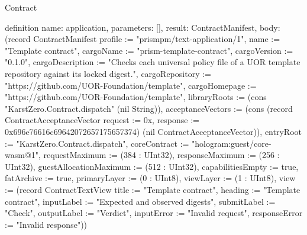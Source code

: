 \begin{lexlean}{Contract}
\begin{semanticmodule}
definition{
  name: application,
  parameters: [],
  result: ContractManifest,
  body: (record ContractManifest {profile := "prismpm/text-application/1", name := "Template contract", cargoName := "prism-template-contract", cargoVersion := "0.1.0", cargoDescription := "Checks each universal policy file of a UOR template repository against its locked digest.", cargoRepository := "https://github.com/UOR-Foundation/template", cargoHomepage := "https://github.com/UOR-Foundation/template", libraryRoots := (cons "KarstZero.Contract.dispatch" (nil String)), acceptanceVectors := (cons (record ContractAcceptanceVector {request := 0x, response := 0x696e76616c69642072657175657374}) (nil ContractAcceptanceVector)), entryRoot := "KarstZero.Contract.dispatch", coreContract := "hologram:guest/core-wasm@1", requestMaximum := (384 : UInt32), responseMaximum := (256 : UInt32), guestAllocationMaximum := (512 : UInt32), capabilitiesEmpty := true, fatArchive := true, primaryLayer := (0 : UInt8), viewLayer := (1 : UInt8), view := (record ContractTextView {title := "Template contract", heading := "Template contract", inputLabel := "Expected and observed digests", submitLabel := "Check", outputLabel := "Verdict", inputError := "Invalid request", responseError := "Invalid response"})})
}
\end{semanticmodule}
\end{lexlean}
